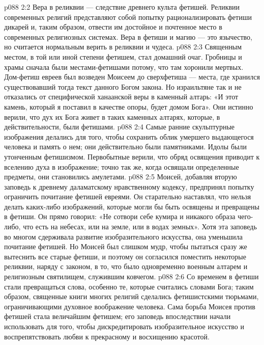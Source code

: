 \vs p088 2:2 Вера в реликвии --- следствие древнего культа фетишей. Реликвии современных религий представляют собой попытку рационализировать фетиши дикарей и, таким образом, отвести им достойное и почтенное место в современных религиозных системах. Вера в фетиши и магию --- это язычество, но считается нормальным верить в реликвии и чудеса.
\vs p088 2:3 Священным местом, в той или иной степени фетишем, стал домашний очаг. Гробницы и храмы сначала были местами\hyp{}фетишами потому, что там хоронили мертвых. Дом\hyp{}фетиш евреев был возведен Моисеем до сверхфетиша --- места, где хранился существовавший тогда текст данного Богом закона. Но израильтяне так и не отказались от специфической ханаанской веры в каменный алтарь: «И этот камень, который я поставил в качестве опоры, будет домом Бога». Они истинно верили, что дух их Бога живет в таких каменных алтарях, которые, в действительности, были фетишами.
\vs p088 2:4 \pc Самые ранние скульптурные изображения делались для того, чтобы сохранить облик умершего выдающегося человека и память о нем; они действительно были памятниками. Идолы были утонченным фетишизмом. Первобытные верили, что обряд освящения приводит к вселению духа в изображение; точно так же, когда освящали определенные предметы, они становились амулетами.
\vs p088 2:5 Моисей, добавляя вторую заповедь к древнему даламатскому нравственному кодексу, предпринял попытку ограничить почитание фетишей евреями. Он старательно наставлял, что нельзя делать каких\hyp{}либо изображений, которые могли бы быть освящены и превращены в фетиши. Он прямо говорил: «Не сотвори себе кумира и никакого образа чего\hyp{}либо, что есть на небесах, или на земле, или в водах земных». Хотя эта заповедь во многом сдерживала развитие изобразительного искусства, она уменьшила почитание фетишей. Но Моисей был слишком мудр, чтобы пытаться сразу же вытеснить все старые фетиши, и поэтому он согласился поместить некоторые реликвии, наряду с законом, в то, что было одновременно военным алтарем и религиозным святилищем, служившим ковчегом.
\vs p088 2:6 \pc Со временем в фетиши стали превращаться слова, особенно те, которые считались словами Бога; таким образом, священные книги многих религий сделались фетишистскими тюрьмами, ограничивающими духовное воображение человека. Сама борьба Моисея против фетишей стала величайшим фетишем; его заповедь впоследствии начали использовать для того, чтобы дискредитировать изобразительное искусство и воспрепятствовать любви к прекрасному и восхищению красотой.
